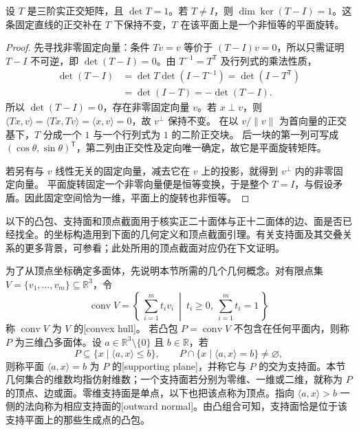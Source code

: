 \begin{lemma}[三维旋转的固定轴]\label{b1:lem:rotation-axis}
	设 \(T\) 是三阶实正交矩阵，且 \(\det T=1\)。若 \(T\ne I\)，则 \(\dim\ker(T-I)=1\)。这条固定直线的正交补在 \(T\) 下保持不变，\(T\) 在该平面上是一个非恒等的平面旋转。
\end{lemma}
\begin{proof}
	先寻找非零固定向量：条件 \(Tv=v\) 等价于 \((T-I)v=0\)，所以只需证明 \(T-I\) 不可逆，即 \(\det(T-I)=0\)。由 \(T^{-1}=T^{\mathsf T}\) 及行列式的乘法性质，
	\[
		\begin{aligned}
			\det(T-I) &=\det T\det(I-T^{-1}) =\det(I-T^{\mathsf T})\\
			&=\det(I-T)=-\det(T-I).
		\end{aligned}
	\]
	所以 \(\det(T-I)=0\)，存在非零固定向量 \(v\)。若 \(x\perp v\)，则 \(\langle Tx,v\rangle=\langle Tx,Tv\rangle=\langle x,v\rangle=0\)，故 \(v^\perp\) 保持不变。 在以 \(v/\lVert v\rVert\) 为首向量的正交基下，\(T\) 分成一个 \(1\) 与一个行列式为 \(1\) 的二阶正交块。 后一块的第一列可写成 \((\cos\theta,\sin\theta)^{\mathsf T}\)，第二列由正交性及定向唯一确定，故它是平面旋转矩阵。

	若另有与 \(v\) 线性无关的固定向量，减去它在 \(v\) 上的投影，就得到 \(v^\perp\) 内的非零固定向量。 平面旋转固定一个非零向量便是恒等变换，于是整个 \(T=I\)，与假设矛盾。因此固定空间恰为一维，平面上的旋转也非恒等。
\end{proof}

以下的凸包、支持面和顶点截面用于核实正二十面体与正十二面体的边、面是否已经找全。的坐标构造用到下面的几何定义和顶点截面引理。有关支持面及其交叠关系的更多背景，可参看\cite[``Faces of Polytopes'', pp.~51--76]{Ziegler1995LecturesPolytopes}；此处所用的顶点截面对应仍在下文证明。

\ProseParagraphBreak
为了从顶点坐标确定多面体，先说明本节所需的几个几何概念。对有限点集 \(V=\{v_1,\ldots,v_m\}\subseteq\mathbb R^3\)，令
\[
	\operatorname{conv}V =\left\{\,\sum_{i=1}^m t_i v_i\ \middle|\ t_i\geq0,\ \sum_{i=1}^m t_i=1\,\right\}
\]
称 \(\operatorname{conv}V\) 为 \(V\) 的[convex hull]。 若凸包 \(P=\operatorname{conv}V\) 不包含在任何平面内，则称 \(P\) 为三维凸多面体。设 \(a\in\mathbb R^3\setminus\{0\}\) 且 \(b\in\mathbb R\)，若
\[
	P\subseteq\{x\mid\langle a,x\rangle\leq b\}, \qquad P\cap\{x\mid\langle a,x\rangle=b\}\ne\varnothing,
\]
则称平面 \(\langle a,x\rangle=b\) 为 \(P\) 的[supporting plane]，并称它与 \(P\) 的交为支持面。本节几何集合的维数均指仿射维数；一个支持面若分别为零维、一维或二维，就称为 \(P\) 的顶点、边或面。零维支持面是单点，以下也把该点称为顶点。指向 \(\langle a,x\rangle>b\) 一侧的法向称为相应支持面的[outward normal]。由凸组合可知，支持面恰是位于该支持平面上的那些生成点的凸包。

